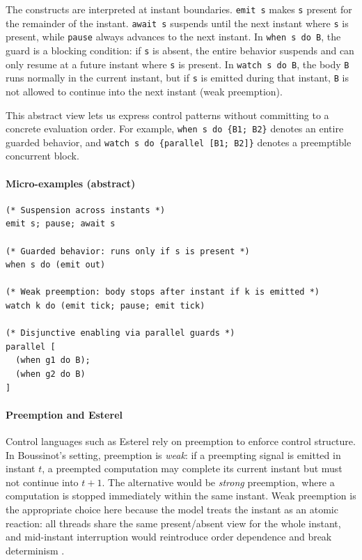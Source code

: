 The constructs are interpreted at instant boundaries. \texttt{emit s} makes
\texttt{s} present for the remainder of the instant. \texttt{await s} suspends
until the next instant where \texttt{s} is present, while \texttt{pause} always
advances to the next instant. In \texttt{when s do B}, the guard is a blocking
condition: if \texttt{s} is absent, the entire behavior suspends and can only
resume at a future instant where \texttt{s} is present. In \texttt{watch s do B},
the body \texttt{B} runs normally in the current instant, but if \texttt{s} is
emitted during that instant, \texttt{B} is not allowed to continue into the next
instant (weak preemption).

This abstract view lets us express control patterns without committing to a
concrete evaluation order. For example, \texttt{when s do \{B1; B2\}} denotes an
entire guarded behavior, and \texttt{watch s do \{parallel [B1; B2]\}} denotes a
preemptible concurrent block.

\paragraph{Micro-examples (abstract)}
\begin{lstlisting}[style=tempo]
(* Suspension across instants *)
emit s; pause; await s

(* Guarded behavior: runs only if s is present *)
when s do (emit out)

(* Weak preemption: body stops after instant if k is emitted *)
watch k do (emit tick; pause; emit tick)

(* Disjunctive enabling via parallel guards *)
parallel [
  (when g1 do B);
  (when g2 do B)
]
\end{lstlisting}

\paragraph{Preemption and Esterel}
Control languages such as Esterel rely on preemption to enforce control
structure. In Boussinot's setting, preemption is \emph{weak}: if a preempting
signal is emitted in instant $t$, a preempted computation may complete its
current instant but must not continue into $t{+}1$. The alternative would be
\emph{strong} preemption, where a computation is stopped immediately within
the same instant. Weak preemption is the appropriate choice here because the
model treats the instant as an atomic reaction: all threads share the same
present/absent view for the whole instant, and mid-instant interruption would
reintroduce order dependence and break determinism \cite{esterel1992,fairthreads2003}.

